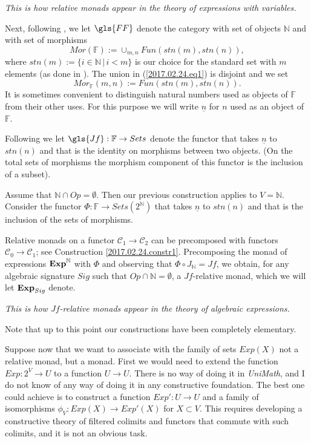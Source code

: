 \documentclass[onecolumn,12pt]{amsart}
\numberwithin{proposition}{subsection}
\newcommand{\sr}{\rightarrow}
\newcommand{\nn}{{\mathbb N}}
\newcommand{\nat}{\nn}
\newcommand{\uu}{\underline}
\newcommand{\C}{{\mathcal C}}
\newcommand{\FF}{{\mathbb F}}
\newcommand{\ff}[1]{\uu{#1}}
\begin{document}
{\em This is how relative monads appear in the theory of expressions with variables.}

Next, following \cite{FPT}, we let $\gls{FF}$ denote the category with set of
objects $\nat$ and with set of morphisms
%
\begin{equation}
\label{2017.02.24.eq1}
Mor(\FF):=\cup_{m,n}Fun(stn(m),stn(n)),
\end{equation}%
%
where $stn(m):=\{i\in\nat\,|\,i<m\}$ is our choice for the standard set with $m$
elements (as done in \cite{LandC}).
The union in (\ref{2017.02.24.eq1}) is disjoint and we set
%
$$Mor_{\FF}(m,n):=Fun(stn(m),stn(n)).$$
%
It is sometimes convenient to distinguish natural numbers used as objects of
$\FF$ from their other uses. For this purpose we will write $\ff{n}$ for $n$
used as an object of $\FF$.

Following \cite{ACU} we let $\gls{Jf}:\FF\sr Sets$ denote the functor that takes $\ff n$ to
$stn(n)$ and that is the identity on morphisms between two objects.  (On the
total sets of morphisms the morphism component of this functor is the inclusion
of a subset).

Assume that $\nat\cap Op=\emptyset$. Then our previous construction applies to
$V=\nat$. Consider the functor $\Phi:\FF\sr Sets(2^{\nat})$ that takes $\ff{n}$
to $stn(n)$ and that is the inclusion of the sets of morphisms.

Relative monads on a functor $\C_1\sr \C_2$ can be precomposed with functors $\C_0\sr\C_1$; see Construction \ref{2017.02.24.constr1}. Precomposing the monad of expressions ${\bf Exp}^{\nat}$ with $\Phi$ and observing that $\Phi\circ J_{\nat}=Jf$, we obtain, for any algebraic signature $Sig$ such that $Op\cap \nat=\emptyset$, a $Jf$-relative monad, which we will let ${\bf Exp}_{Sig}$ denote. 

{\em This is how $Jf$-relative monads appear in the theory of algebraic expressions.} 

Note that up to this point our constructions have been completely elementary.

Suppose now that we want to associate with the family of sets $Exp(X)$ not a
relative monad, but a monad. First we would need to extend the function
$Exp:2^V\sr U$ to a function $U\sr U$. There is no way of doing it in
{\em UniMath}, and I do not know of any way of doing it in any constructive
foundation. The best one could achieve is to construct a function $Exp':U\sr U$
and a family of isomorphisms $\phi_V:Exp(X)\sr Exp'(X)$ for $X\subset V$. This
requires developing a constructive theory of filtered colimits and functors
that commute with such colimits, and it is not an obvious task.
\end{document}
